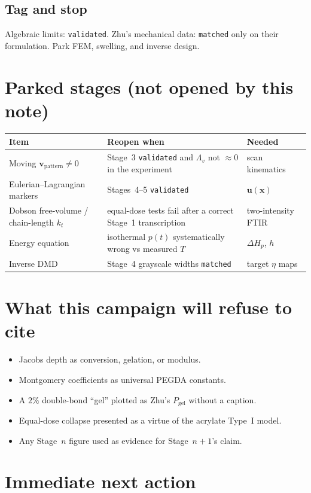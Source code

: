 \documentclass[11pt,a4paper]{article}
\newcommand{\tagvalid}{\texttt{validated}}
\newcommand{\tagmatch}{\texttt{matched}}
\begin{document}
\subsection{Tag and stop}
Algebraic limits: \tagvalid.
Zhu's mechanical data: \tagmatch{} only on their formulation.
Park FEM, swelling, and inverse design.

\section{Parked stages (not opened by this note)}

\begin{tabularx}{\textwidth}{@{}lXl@{}}
\toprule
Item & Reopen when & Needed \\
\midrule
Moving $\mathbf{v}_{\mathrm{pattern}}\neq 0$ & Stage~3 \tagvalid{} and $\Lambda_v$ not $\approx 0$ in the experiment & scan kinematics \\
Eulerian--Lagrangian markers & Stages~4--5 \tagvalid & $\mathbf{u}(\mathbf{x})$ \\
Dobson free-volume / chain-length $k_t$ & equal-dose tests fail after a correct Stage~1 transcription & two-intensity FTIR \\
Energy equation & isothermal $p(t)$ systematically wrong vs measured $T$ & $\Delta H_p$, $h$ \\
Inverse DMD & Stage~4 grayscale widths \tagmatch{} & target $\eta$ maps \\
\bottomrule
\end{tabularx}

\section{What this campaign will refuse to cite}

\begin{itemize}
  \item Jacobs depth as conversion, gelation, or modulus.
  \item Montgomery coefficients as universal PEGDA constants.
  \item A $2\%$ double-bond ``gel'' plotted as Zhu's $P_{\mathrm{gel}}$ without a caption.
  \item Equal-dose collapse presented as a virtue of the acrylate Type~I model.
  \item Any Stage~$n$ figure used as evidence for Stage~$n+1$'s claim.
\end{itemize}

\section{Immediate next action}
\end{document}
